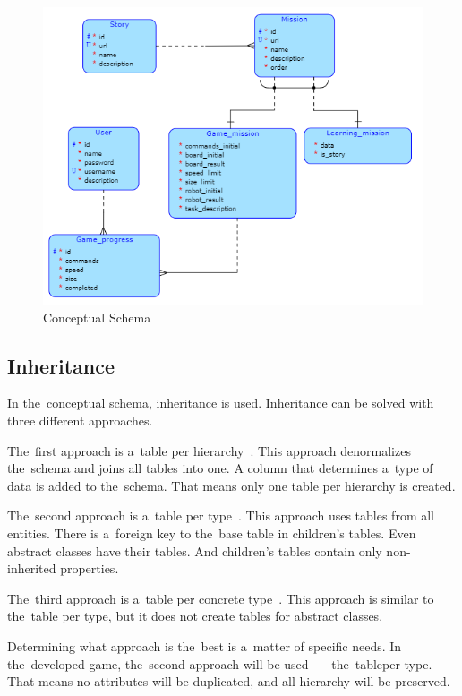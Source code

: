 \begin{figure}
    \centering
    \includegraphics[width=1\linewidth]{assets/design/conceptualdiagram.png}
    \caption{Conceptual Schema}
    \label{fig:design:conceptualschema}
\end{figure}

\pagebreak

\subsection{Inheritance}

In the~conceptual schema, inheritance is used.
Inheritance can be solved with three different approaches.

The~first approach is a~table per hierarchy~\cite{a2010_enterprise}.
This approach denormalizes the~schema and joins all tables into one.
A column that determines a~type of data is added to the~schema.
That means only one table per hierarchy is created.

The~second approach is a~table per type~\cite{a2010_enterprise}.
This approach uses tables from all entities.
There is a~foreign key to the~base table in children's tables.
Even abstract classes have their tables.
And children's tables contain only non-inherited properties.

The~third approach is a~table per concrete type~\cite{a2010_enterprise}.
This approach is similar to the~table per type, but it does not create tables for abstract classes.

Determining what approach is the~best is a~matter of specific needs.
\linebreak
In the~developed game, the~second approach will be used~--- the~table\linebreak{}per type.
That means no attributes will be duplicated, and all hierarchy will be preserved.
